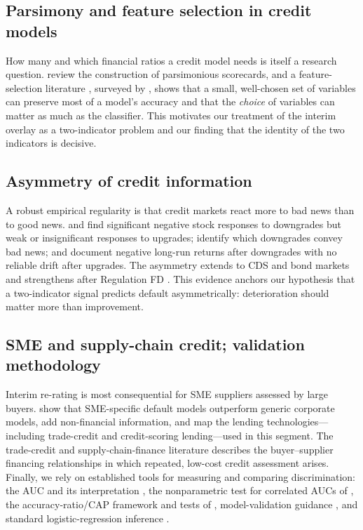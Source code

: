 \documentclass[pdflatex,sn-mathphys-ay]{sn-jnl}
\begin{document}
\subsection{Parsimony and feature selection in credit models}
How many and which financial ratios a credit model needs is itself a research question.
\citet{handhenley1997} review the construction of parsimonious scorecards, and a feature-selection
literature \citep{tsai2009,dujardin2010,liang2015,hajek2013,laborda2021}, surveyed by
\citet{lin2012}, shows that a small, well-chosen set of variables can preserve most of a model's
accuracy and that the \emph{choice} of variables can matter as much as the classifier. This
motivates our treatment of the interim overlay as a two-indicator problem and our finding that the
identity of the two indicators is decisive.

\subsection{Asymmetry of credit information}
A robust empirical regularity is that credit markets react more to bad news than to good news.
\citet{holthausen1986} and \citet{hand1992} find significant negative stock responses to
downgrades but weak or insignificant responses to upgrades; \citet{goh1993} identify which
downgrades convey bad news; and \citet{dichev2001} document negative long-run returns after
downgrades with no reliable drift after upgrades. The asymmetry extends to CDS and bond markets
\citep{hull2004,norden2004} and strengthens after Regulation FD \citep{jorion2005}. This evidence
anchors our hypothesis that a two-indicator signal predicts default asymmetrically: deterioration
should matter more than improvement.

\subsection{SME and supply-chain credit; validation methodology}
Interim re-rating is most consequential for SME suppliers assessed by large buyers.
\citet{altmansabato2007} show that SME-specific default models outperform generic corporate models,
\citet{altman2010nonfinancial} add non-financial information, and \citet{berger2006} map the
lending technologies---including trade-credit and credit-scoring lending---used in this segment.
The trade-credit and supply-chain-finance literature \citep{petersen1997,mian1992,giannetti2011,wuttke2013}
describes the buyer--supplier financing relationships in which repeated, low-cost credit
assessment arises. Finally, we rely on established tools for measuring and comparing
discrimination: the AUC and its interpretation \citep{hanley1982}, the nonparametric test for
correlated AUCs of \citet{delong1988}, the accuracy-ratio/CAP framework and tests of
\citet{engelmann2003}, model-validation guidance \citep{stein2007,krahnen2001}, and standard
logistic-regression inference \citep{hosmer2013}.
\end{document}

